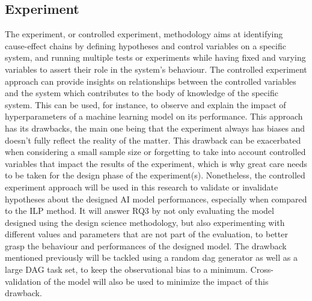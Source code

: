\subsection{Experiment}
 
 
The experiment, or controlled experiment, methodology aims at identifying cause-effect 
chains by defining hypotheses and control variables on a specific system,
and running multiple tests or experiments while having fixed and varying variables to assert 
their role in the system's behaviour\cite{basili2007controlledExperiment}.
The controlled experiment approach 
can provide insights on relationships between the controlled variables and the system
which contributes to the body of knowledge of the specific system.
This can be used, for instance, to observe and explain the impact of hyperparameters of a machine learning
model on its performance.
This approach has its drawbacks, the main one being 
that the experiment always has biases and doesn't fully reflect the reality
of the matter. This drawback can be exacerbated when considering 
a small sample size or forgetting
to take into account controlled variables that impact the results
of the experiment, which is why great care needs to be taken 
for the design phase of the experiment(s).
Nonetheless, the controlled experiment approach will be used in this research to validate or invalidate hypotheses
about the designed AI model performances, especially when compared to the ILP method.
It will answer RQ3 by not only evaluating the model designed using the design science methodology, 
but also experimenting with different values and parameters that are not part of the evaluation,
to better grasp the behaviour and performances of the designed model.
The drawback mentioned previously will be tackled using a random dag generator as well as a 
large DAG task set, to keep the observational bias to a minimum.
Cross-validation of the model will also be used to minimize the impact of this drawback.\\


